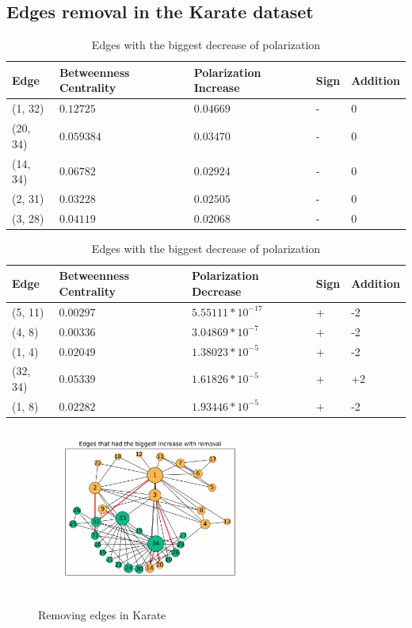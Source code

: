 \subsection{Edges removal in the Karate dataset}

\begin{table}[H]
 \centering
 \caption{Edges with the biggest increase of polarization}
 \label{tab:edgesLargest}
 \begin{tabular}{| l || l | l | l | l |}
 \hline
  Edge & Betweenness Centrality & Polarization Increase & Sign & Addition\\
  \hline
  \hline
  (1, 32) & $0.12725$ & $0.04669$ & - &  0\\
  \hline
  (20, 34) & $0.059384$ & $0.03470$ & - &  0\\
  \hline
  (14, 34) & $0.06782$ & $0.02924$ & - &  0\\
  \hline
  (2, 31) & $0.03228$ & $0.02505$ & - &  0\\
  \hline
  (3, 28) & $0.04119$ & $0.02068$ & - &  0\\
  \hline
 \end{tabular}
  
 \caption{Edges with the biggest decrease of polarization }
 \label{tab:edgesLargest}
 \begin{tabular}{| l || l | l | l | l |}
 \hline
  Edge & Betweenness Centrality & Polarization Decrease & Sign & Addition\\
  \hline
  \hline
  (5, 11) & $0.00297$ & $5.55111*10^{-17}$ & + &  -2\\
  \hline
  (4, 8) & $0.00336$ & $3.04869*10^{-7}$ & + &  -2\\
  \hline
  (1, 4) & $0.02049$ & $1.38023*10^{-5}$ & + &  -2\\
  \hline
  (32, 34) & $0.05339$ & $1.61826*10^{-5}$ & + &  +2\\
  \hline
  (1, 8) & $0.02282$ & $1.93446*10^{-5}$ & + &  -2\\
  \hline
  \hline
 \end{tabular}
\end{table}

\begin{figure}[H]
	\centering
	\includegraphics[width=0.65\textwidth]{Figures/karate_increase}
	\label{fig:karate_increase}
	\caption{Removing edges in Karate}
\end{figure}

